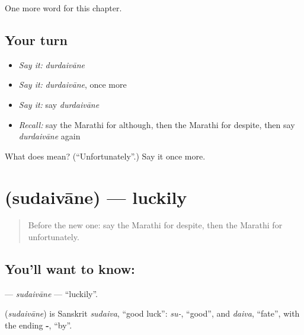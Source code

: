 \begin{grammarlens}[title={What you've built}]
One more word for this chapter.
\end{grammarlens}

\subsection*{Your turn}
\begin{itemize}
\raggedright
  \item \emph{Say it:} \emph{durdaivāne}
  \item \emph{Say it:} \emph{durdaivāne}, once more
  \item \emph{Say it:} say \emph{durdaivāne}
  \item \emph{Recall:} say the Marathi for although, then the Marathi for despite, then say \emph{durdaivāne} again
\end{itemize}

\begin{tcolorbox}[breakable,colback=teal!4,colframe=teal!35!black,title={Before you move on}]
What does  mean? (\textquotedblleft{}Unfortunately\textquotedblright{}.) Say it once more.
\end{tcolorbox}
\section[\texorpdfstring{\mr{सुदैवाने} (sudaivāne)}{सुदैवाने (sudaivāne)}]{ (sudaivāne) — luckily}

\label{lesson:MR-C173-sudaivane}



\begin{quote}
Before the new one: say the Marathi for despite, then the Marathi for unfortunately.
\end{quote}

\subsection*{You'll want to know: }
\textbf{} — \emph{sudaivāne} — \textquotedblleft{}luckily\textquotedblright{}.

\begin{cousinweb}
\textbf{} (\emph{sudaivāne}) is Sanskrit \emph{sudaiva}, \textquotedblleft{}good luck\textquotedblright{}: \emph{su-}, \textquotedblleft{}good\textquotedblright{}, and \emph{daiva}, \textquotedblleft{}fate\textquotedblright{}, with the ending \textbf{-}, \textquotedblleft{}by\textquotedblright{}.
\end{cousinweb}

